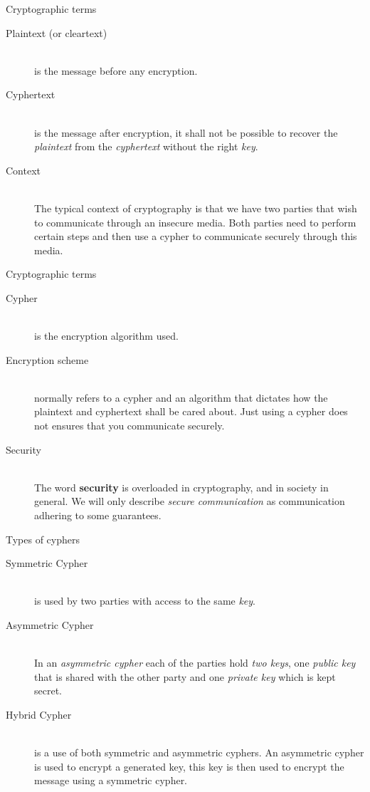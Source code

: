 \documentclass[hyperref={colorlinks=true}]{beamer}
\begin{document}
\begin{frame}{Cryptographic terms}
  \begin{description}
    \item[Plaintext (or cleartext)] \hfill \\
is the message before any encryption.
    \item[Cyphertext] \hfill \\
is the message after encryption, it shall not be possible to recover the
\emph{plaintext} from the \emph{cyphertext} without the right \emph{key}.
    \item[Context] \hfill \\
The typical context of cryptography is that we have two parties that wish to
communicate through an insecure media.  Both parties need to perform certain
steps and then use a cypher to communicate securely through this media.
  \end{description}
\end{frame}

\begin{frame}{Cryptographic terms}
  \begin{description}
    \item[Cypher] \hfill \\
is the encryption algorithm used.
    \item[Encryption scheme] \hfill \\
normally refers to a cypher and an algorithm that dictates how the plaintext
and cyphertext shall be cared about.  Just using a cypher does not ensures that
you communicate securely.
    \item[Security] \hfill \\
The word \textbf{security} is overloaded in cryptography, and in society in
general.  We will only describe \emph{secure communication} as communication
adhering to some guarantees.
  \end{description}
\end{frame}

\begin{frame}{Types of cyphers}
  \begin{description}
    \item[Symmetric Cypher] \hfill \\
is used by two parties with access to the same \emph{key}.
    \item[Asymmetric Cypher] \hfill \\
In an \emph{asymmetric cypher} each of the parties hold \emph{two keys}, one
\emph{public key} that is shared with the other party and one \emph{private
key} which is kept secret.
    \item[Hybrid Cypher] \hfill \\
is a use of both symmetric and asymmetric cyphers.  An asymmetric cypher is
used to encrypt a generated key, this key is then used to encrypt the message
using a symmetric cypher.
  \end{description}
\end{frame}
\end{document}
